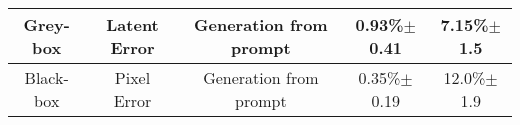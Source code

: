 \begin{tabular}{c c c c c}
    Grey-box                    & Latent Error                  & Generation from prompt & 0.93\%$\pm$0.41                                      & 7.15\%$\pm$1.5     \\
    \midrule
    Black-box                   & Pixel Error                   & Generation from prompt & 0.35\%$\pm$0.19                                      & 12.0\%$\pm$1.9     \\
    \bottomrule
\end{tabular}